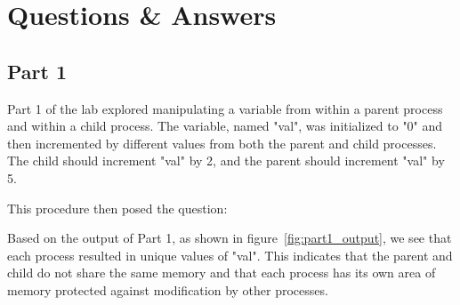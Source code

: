 
\section{Questions \& Answers}\label{sec:qa}

    \subsection{Part 1}\label{subsec:part1_qa}
        Part 1 of the lab explored manipulating a variable from within a parent process and within a child process.
        The variable, named "val", was initialized to "0" and then incremented by different values from both the parent and child processes.
        The child should increment "val" by 2, and the parent should increment "val" by 5.

        \medskip
        \noindent This procedure then posed the question:
        \medskip


        \medskip
        \noindent Based on the output of Part 1, as shown in figure~\ref{fig:part1_output}, we see that each process resulted in unique values of "val".
        This indicates that the parent and child do not share the same memory and that each process has its own area of memory protected against modification by other processes.